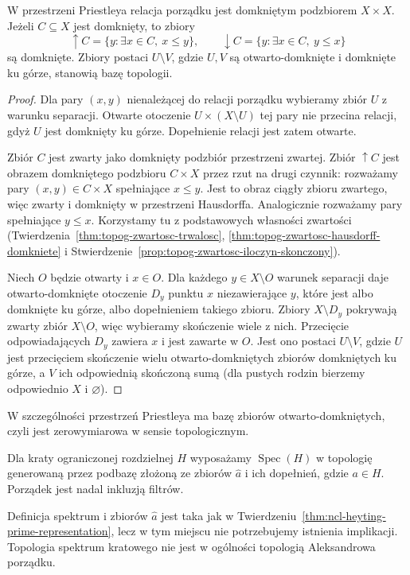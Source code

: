 \begin{lemat}
\label{lem:ncl-heyting-priestley-order}
W przestrzeni Priestleya relacja porządku jest
domkniętym podzbiorem $X\times X$.
Jeżeli $C\subseteq X$ jest domknięty, to zbiory
\[
 \uparrow C=\{y:\exists x\in C,\ x\leq y\},
 \qquad
 \downarrow C=\{y:\exists x\in C,\ y\leq x\}
\]
są domknięte.
Zbiory postaci $U\setminus V$, gdzie $U,V$ są
otwarto-domknięte i domknięte ku górze,
stanowią bazę topologii.
\end{lemat}
\begin{proof}
Dla pary $(x,y)$ nienależącej do relacji porządku
wybieramy zbiór $U$ z warunku separacji.
Otwarte otoczenie $U\times(X\setminus U)$
tej pary nie przecina relacji, gdyż $U$ jest
domknięty ku górze. Dopełnienie relacji jest
zatem otwarte.

Zbiór $C$ jest zwarty jako domknięty podzbiór
przestrzeni zwartej. Zbiór $\uparrow C$ jest
obrazem domkniętego podzbioru $C\times X$
przez rzut na drugi czynnik: rozważamy pary
$(x,y)\in C\times X$ spełniające $x\leq y$.
Jest to obraz ciągły zbioru zwartego,
więc zwarty i domknięty w przestrzeni Hausdorffa.
Analogicznie rozważamy pary spełniające $y\leq x$.
Korzystamy tu z podstawowych własności zwartości
(Twierdzenia~\ref{thm:topog-zwartosc-trwalosc},
\ref{thm:topog-zwartosc-hausdorff-domkniete}
i Stwierdzenie~\ref{prop:topog-zwartosc-iloczyn-skonczony}).

Niech $O$ będzie otwarty i $x\in O$.
Dla każdego $y\in X\setminus O$ warunek separacji
daje otwarto-domknięte otoczenie $D_y$ punktu $x$
niezawierające $y$, które jest albo domknięte
ku górze, albo dopełnieniem takiego zbioru.
Zbiory $X\setminus D_y$ pokrywają zwarty
zbiór $X\setminus O$, więc wybieramy skończenie
wiele z nich. Przecięcie odpowiadających $D_y$
zawiera $x$ i jest zawarte w $O$.
Jest ono postaci $U\setminus V$, gdzie $U$ jest
przecięciem skończenie wielu otwarto-domkniętych
zbiorów domkniętych ku górze, a $V$ ich odpowiednią
skończoną sumą (dla pustych rodzin bierzemy
odpowiednio $X$ i $\varnothing$).
\end{proof}
W szczególności przestrzeń Priestleya ma bazę
zbiorów otwarto-domkniętych, czyli jest
zerowymiarowa w sensie topologicznym.

\begin{definicja}
\label{def:ncl-heyting-prime-topology}
Dla kraty ograniczonej rozdzielnej $H$ wyposażamy
$\operatorname{Spec}(H)$ w topologię generowaną
przez podbazę złożoną ze zbiorów $\widehat a$
i ich dopełnień, gdzie $a\in H$.
Porządek jest nadal inkluzją filtrów.
\end{definicja}
Definicja spektrum i zbiorów $\widehat a$ jest
taka jak w
Twierdzeniu~\ref{thm:ncl-heyting-prime-representation},
lecz w tym miejscu nie potrzebujemy istnienia
implikacji. Topologia spektrum kratowego nie jest
w ogólności topologią Aleksandrowa porządku.

